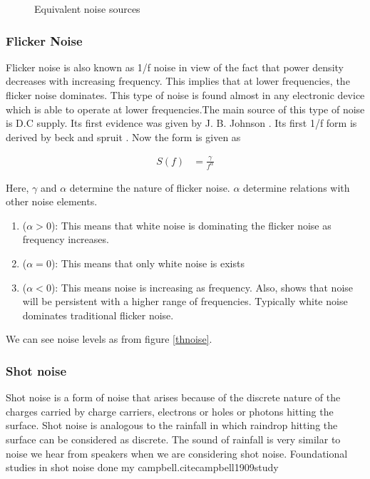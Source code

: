 \documentclass[draft,12pt]{article}
\begin{document}
\begin{figure}[hbt!]
\caption{Equivalent noise sources}
\end{figure}

\subsubsection{Flicker Noise \label{thflicker}}

Flicker noise is also known as 1/f noise in view of the fact that power density decreases with increasing frequency. This implies that at lower frequencies, the flicker noise dominates.
This type of noise is found  almost in any electronic device which is able to operate at lower frequencies.The main source of this type of noise is D.C supply. Its first evidence was given by J. B. Johnson \cite{johnson1925schottky}. Its first 1/f form is derived by beck and spruit \cite{beck19781}. Now the form is given as 

\begin{align}
S(f) & = \frac{\gamma}{f^{\alpha}}
\end{align}

Here, $\gamma$ and $\alpha$ determine the nature of flicker noise. $\alpha$ determine relations with other noise elements.

\begin{enumerate}
\item ($\alpha > 0$): This means that white noise is dominating the flicker noise as frequency increases.
\item ($\alpha = 0$): This means that only white noise is exists
\item ($\alpha < 0$): This means noise is increasing as frequency. Also, shows that noise will be persistent with a higher range of frequencies. Typically white noise dominates traditional flicker noise.
\end{enumerate}

We can see noise levels as from figure \ref{thnoise}.

\subsubsection{Shot noise \label{thshot}}

Shot noise is a form of noise that arises because of the discrete nature of the charges carried by charge carriers, electrons or holes or photons hitting the surface. Shot noise is analogous to the rainfall in which raindrop hitting the surface can be considered as discrete. The sound of rainfall is very similar to noise we hear from speakers when we are considering shot noise. Foundational studies in shot noise done my campbell.cite{campbell1909study}
\end{document}
